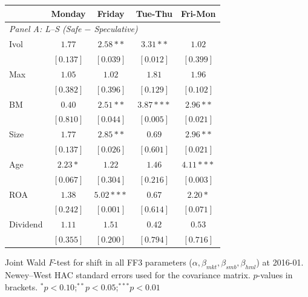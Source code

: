 \centering
\footnotesize
\begin{tabular}{l c c c c}
\toprule
 & Monday & Friday & Tue-Thu & Fri-Mon \\
\midrule
\multicolumn{5}{l}{\textit{Panel A: L--S (Safe $-$ Speculative)}} \\
Ivol & $1.77$ & $2.58**$ & $3.31**$ & $1.02$ \\
 & $[0.137]$ & $[0.039]$ & $[0.012]$ & $[0.399]$ \\
Max & $1.05$ & $1.02$ & $1.81$ & $1.96$ \\
 & $[0.382]$ & $[0.396]$ & $[0.129]$ & $[0.102]$ \\
BM & $0.40$ & $2.51**$ & $3.87***$ & $2.96**$ \\
 & $[0.810]$ & $[0.044]$ & $[0.005]$ & $[0.021]$ \\
Size & $1.77$ & $2.85**$ & $0.69$ & $2.96**$ \\
 & $[0.137]$ & $[0.026]$ & $[0.601]$ & $[0.021]$ \\
Age & $2.23*$ & $1.22$ & $1.46$ & $4.11***$ \\
 & $[0.067]$ & $[0.304]$ & $[0.216]$ & $[0.003]$ \\
ROA & $1.38$ & $5.02***$ & $0.67$ & $2.20*$ \\
 & $[0.242]$ & $[0.001]$ & $[0.614]$ & $[0.071]$ \\
Dividend & $1.11$ & $1.51$ & $0.42$ & $0.53$ \\
 & $[0.355]$ & $[0.200]$ & $[0.794]$ & $[0.716]$ \\
\bottomrule
\end{tabular}
\vspace{4pt}
\begin{minipage}{0.9\textwidth}
\footnotesize
Joint Wald $F$-test for shift in all FF3 parameters ($\alpha, \beta_{mkt}, \beta_{smb}, \beta_{hml}$) at 2016-01.
Newey--West HAC standard errors used for the covariance matrix.
$p$-values in brackets. $^{*}p<0.10$;\quad $^{**}p<0.05$;\quad $^{***}p<0.01$
\end{minipage}